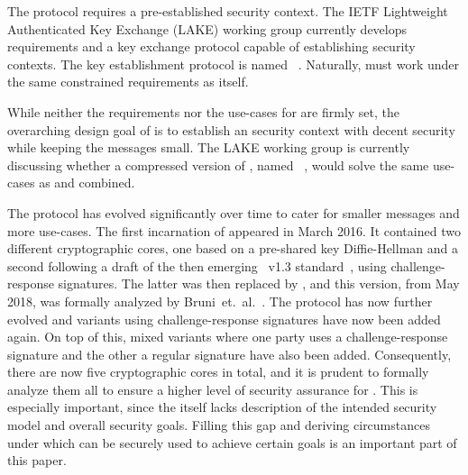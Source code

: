 \documentclass[runningheads,draft]{llncs}
\begin{document}
The \mOscore{} protocol requires a pre-established security context.
%
The IETF Lightweight Authenticated Key Exchange (LAKE) working group
currently develops requirements and a key exchange protocol capable of
establishing \mOscore{} security contexts.
%
The key establishment protocol is named \mEdhoc~\cite{selander-lake-edhoc-01}.
%
Naturally, \mEdhoc{} must work under the same constrained requirements as
\mOscore{} itself.
%

While neither the requirements nor the use-cases for \mEdhoc{} are firmly set,
the overarching design goal of \mEdhoc{} is to establish an \mOscore{} security
context with decent security while keeping the messages small.
%
The LAKE working group is currently discussing whether a compressed version of
\mTls, named \mCtls~\cite{ietf-tls-ctls-00}, would solve the same use-cases as
\mOscore{} and \mEdhoc{} combined.
%

The \mEdhoc{} protocol has evolved significantly over time to cater for smaller
messages and more use-cases.
%
The first incarnation of \mEdhoc{} appeared in March 2016.
%
It contained two different cryptographic cores, one based on a
pre-shared key Diffie-Hellman and a second following a draft of the
then emerging \mbox{\mTls{} v1.3} standard~\cite{ietf-tls-tls13-11}, using
challenge-response signatures.
%
The latter was then replaced by \mSigma, and this version, from May 2018, was
formally analyzed by Bruni~et.~al.~\cite{DBLP:conf/secsr/BruniJPS18}.
%
The protocol has now further evolved and variants using challenge-response
signatures have now been added again.
%
On top of this, mixed variants where one party uses a challenge-response
signature and the other a regular signature have also been added.
%
Consequently, there are now five cryptographic cores in total, and it is prudent
to formally analyze them all to ensure a higher level of security assurance for
\mEdhoc.
%
This is especially important, since the \mSpec{} itself lacks description of the
intended security model and overall security goals.
%
Filling this gap and deriving circumstances under which \mEdhoc{} can be
securely used to achieve certain goals is an important part of this paper.
%

\end{document}
